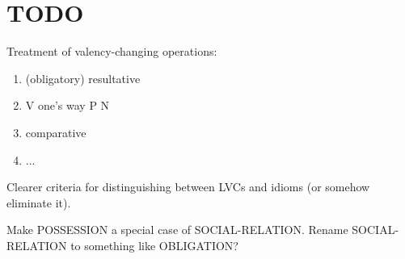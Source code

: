 \documentclass[a4paper]{article}
\begin{document}
\newpage\section{TODO}

Treatment of valency-changing operations:

\begin{enumerate}
    \item (obligatory) resultative
    \item V one's way P N
    \item comparative
    \item ...
\end{enumerate}

Clearer criteria for distinguishing between LVCs and idioms (or somehow eliminate it).

Make POSSESSION a special case of SOCIAL-RELATION. Rename SOCIAL-RELATION to
something like OBLIGATION?



\end{document}
